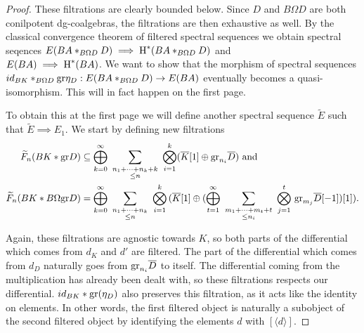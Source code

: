 \documentclass[../thesis.tex]{subfiles}
\begin{document}
\begin{proof}
                These filtrations are clearly bounded below. Since $D$ and $B\Omega D$ are both conilpotent dg-coalgebras, the filtrations are then exhaustive as well. By the classical convergence theorem of filtered spectral sequences we obtain spectral seqences $E(BA\ast_{B\Omega D}D) \implies \tt{H}^*(BA\ast_{B\Omega D}D)$ and \\ $E(BA) \implies \tt{H}^*(BA)$. We want to show that the morphism of spectral sequences $id_{BK}\ast_{B\Omega D}\tt{gr}\eta_D : E(BA\ast_{B\Omega D}D) \rightarrow E(BA)$ eventually becomes a quasi-isomorphism. This will in fact happen on the first page.

                To obtain this at the first page we will define another spectral sequence $\widetilde{E}$ such that $\widetilde{E} \implies E_1$. We start by defining new filtrations
                \begin{align*}
                    \widetilde{F}_n(BK\ast\tt{gr}D) & \subseteq \bigoplus_{k=0}^\infty\,\,\sum_{\substack{n_1+\cdots +n_k + k \\ \leq n}}\,\,\bigotimes_{i=1}^k(\overline{K}[1]\oplus \tt{gr}_{n_i}\overline{D})\tt{ and} \\
                    \widetilde{F}_n(BK\ast B\Omega\tt{gr}D) & = \bigoplus_{k=0}^\infty\,\,\sum_{\substack{n_1+\cdots +n_k \\ \leq n}}\,\,\bigotimes_{i=1}^k\,(\overline{K}[1]\oplus(\bigoplus_{t=1}^\infty\,\,\sum_{\substack{m_1+\cdots +m_t + t \\ \leq n_i}}\,\,\bigotimes_{j=1}^t\,\tt{gr}_{m_j}\overline{D}[-1])[1])\tt{.}
                \end{align*}

                Again, these filtrations are agnostic towards $K$, so both parts of the differential which comes from $d_K$ and $d'$ are filtered. The part of the differential which comes from $d_D$ naturally goes from $\tt{gr}_{n_i}\overline{D}$ to itself. The differential coming from the multiplication has already been dealt with, so these filtrations respects our differential. $id_{BK}\ast\tt{gr}(\eta_D)$ also preserves this filtration, as it acts like the identity on elements. In other words, the first filtered object is naturally a subobject of the second filtered object by identifying the elements $d$ with $[\langle d \rangle ]$.


\end{proof}
\end{document}
